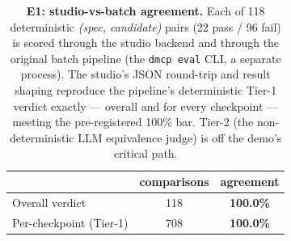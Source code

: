 \begin{table}[t]
  \centering \small
  \begin{tabular}{lcc}
    \toprule
    & \textbf{comparisons} & \textbf{agreement} \\
    \midrule
    Overall verdict        & 118 & \textbf{100.0\%} \\
    Per-checkpoint (Tier-1) & 708 & \textbf{100.0\%} \\
    \bottomrule
  \end{tabular}
  \caption{\textbf{E1: studio-vs-batch agreement.} Each of 118 deterministic
    \emph{(spec, candidate)} pairs (22 pass / 96 fail) is scored through the
    studio backend and through the original batch pipeline (the \texttt{dmcp
    eval} CLI, a separate process). The studio's JSON round-trip and result
    shaping reproduce the pipeline's deterministic Tier-1 verdict exactly
    --- overall and for every checkpoint --- meeting the pre-registered 100\%
    bar. Tier-2 (the non-deterministic LLM equivalence judge) is off the demo's
    critical path.}
  \label{tab:agreement}
\end{table}

